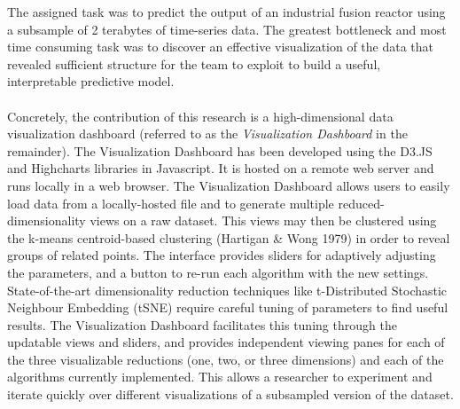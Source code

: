 \documentclass{sigchi}
\begin{document}
%
The assigned task was to predict the output of an industrial fusion reactor using a subsample of 2 terabytes of time-series data. %
%
The greatest bottleneck and most time consuming task was to discover an effective visualization of the data that revealed sufficient structure for the team to exploit to build a useful, interpretable predictive model. %
%
\\\\
%
Concretely, the contribution of this research is a high-dimensional data visualization dashboard (referred to as the \textit{Visualization Dashboard} in the remainder). %
%
The Visualization Dashboard has been developed using the D3.JS and Highcharts libraries in Javascript. %
%
It is hosted on a remote web server and runs locally in a web browser. %
%
The Visualization Dashboard allows users to easily load data from a locally-hosted file and to generate multiple reduced-dimensionality views on a raw dataset. %
%
%
This views may then be clustered using the k-means centroid-based clustering (Hartigan \& Wong 1979) in order to reveal groups of related points. %
%
The interface provides sliders for adaptively adjusting the parameters, and a button to re-run each algorithm with the new settings. %
%
State-of-the-art dimensionality reduction techniques like t-Distributed Stochastic Neighbour Embedding (tSNE) \cite{maaten2008visualizing} require careful tuning of parameters to find useful results. %
%
The Visualization Dashboard facilitates this tuning through the updatable views and sliders, and provides independent viewing panes for each of the three visualizable reductions (one, two, or three dimensions) and each of the algorithms currently implemented. %
%
This allows a researcher to experiment and iterate quickly over different visualizations of a subsampled version of the dataset. %
%
\end{document}
